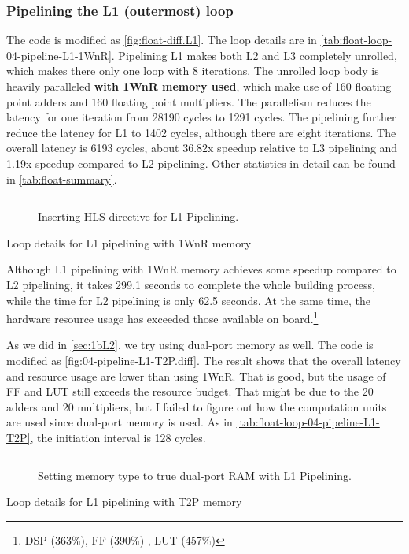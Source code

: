 \subsubsection{Pipelining the L1 (outermost) loop}\label{sec:1bL1}

The code is modified as \autoref{fig:float-diff.L1}.
The loop details are in \autoref{tab:float-loop-04-pipeline-L1-1WnR}.
Pipelining L1 makes both L2 and L3 completely unrolled, which makes there only one loop with 8 iterations.
The unrolled loop body is heavily paralleled \textbf{with 1WnR memory used}, which make use of 160 floating point adders and 160 floating point multipliers.
The parallelism reduces the latency for one iteration from 28190 cycles to 1291 cycles.
The pipelining further reduce the latency for L1 to 1402 cycles, although there are eight iterations.
The overall latency is 6193 cycles, about 36.82x speedup relative to L3 pipelining and 1.19x speedup compared to L2 pipelining.
Other statistics in detail can be found in \autoref{tab:float-summary}.

\begin{figure}[ht!]
    \centering
    \inputminted{diff}{program/diff.L1}
    \caption{Inserting HLS directive for L1 Pipelining.}\label{fig:float-diff.L1}
\end{figure}

\begin{table}[ht!]
    \caption{Loop details for L1 pipelining with 1WnR memory}
    \label{tab:float-loop-04-pipeline-L1-1WnR}
    \centering
    
\end{table}

Although L1 pipelining with 1WnR memory achieves some speedup compared to L2 pipelining, it takes 299.1 seconds to complete the whole building process, while the time for L2 pipelining is only 62.5 seconds.
At the same time, the hardware resource usage has exceeded those available on board.\footnote{
    DSP (363\%), FF (390\%) , LUT (457\%)
}

As we did in \autoref{sec:1bL2}, we try using dual-port memory as well.
The code is modified as \autoref{fig:04-pipeline-L1-T2P.diff}.
The result shows that the overall latency and resource usage are lower than using 1WnR.
That is good, but the usage of FF and LUT still exceeds the resource budget.
That might be due to the 20 adders and 20 multipliers, but I failed to figure out how the computation units are used since dual-port memory is used.
As in \autoref{tab:float-loop-04-pipeline-L1-T2P}, the initiation interval is 128 cycles.

\begin{figure}[ht!]
    \centering
    \inputminted[firstline=3]{diff}{program/04-pipeline-L1-T2P.diff}
    \caption{Setting memory type to true dual-port RAM with L1 Pipelining.}\label{fig:04-pipeline-L1-T2P.diff}
\end{figure}

\begin{table}[ht!]
    \caption{Loop details for L1 pipelining with T2P memory}
    \label{tab:float-loop-04-pipeline-L1-T2P}
    \centering
    
\end{table}